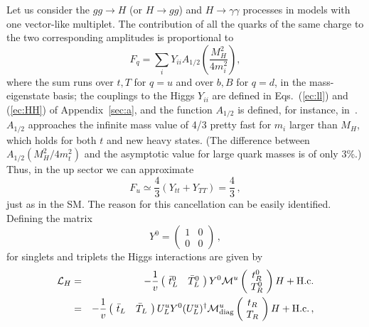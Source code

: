 \documentclass[12pt,a4paper]{article}
\begin{document}
Let us consider  the $gg\to H$ (or $H \to gg$) and $H \to \gamma \gamma$ processes in models with one vector-like multiplet. The contribution of all the quarks of the same charge to the two corresponding amplitudes is proportional to
\begin{equation}
F_q=\sum_i Y_{ii} A_{1/2}\left(\frac{M_H^2}{4 m_i^2} \right),
\end{equation}
where the  sum runs over $t,T$ for $q=u$ and over $b,B$ for $q=d$, in the mass-eigenstate basis; the couplings to the Higgs $Y_{ii}$ are defined in Eqs.~(\ref{ec:ll}) and (\ref{ec:HH}) of Appendix~\ref{sec:a}, and the function $A_{1/2}$ is defined, for instance, in~\cite{Djouadi:2005gi}. $A_{1/2}$ approaches the infinite mass value of 4/3 pretty fast for $m_i$ larger than $M_H$, which holds for both $t$ and new heavy states. (The difference between $A_{1/2}(M_H^2/4 m_t^2)$ and the asymptotic value for large quark masses is of only 3\%.) Thus, in the up sector we can approximate
\begin{equation}
F_u \simeq \frac{4}{3} \left( Y_{tt} + Y_{TT} \right) = \frac{4}{3} \,,
\end{equation}
just as in the SM. The reason for this cancellation can be easily identified. Defining the matrix
\begin{equation}
Y^0=\left( \begin{array}{cc} 1&0\\ 0 & 0 \end{array} \right) \,,
\end{equation}
for singlets and triplets the Higgs interactions are given by
\begin{eqnarray}
\mathcal{L}_H & = & - \frac{1}{v} \left(\! \begin{array}{cc} \bar t_L^0 & \bar T_L^0 \end{array} \!\right)
Y^0 \mathcal{M}^u
\left(\! \begin{array}{c} t^0_R \\ T^0_R \end{array}
\!\right) H + \text{H.c.} \notag \\
& = &
- \frac{1}{v} \left(\! \begin{array}{cc} \bar t_L & \bar T_L \end{array} \!\right) U_L^u
Y^0 (U_L^u)^\dagger \mathcal{M}^u_\text{diag}
\left(\! \begin{array}{c} t_R \\ T_R \end{array}
\!\right) H + \text{H.c.} \,,
\end{eqnarray}
\end{document}
